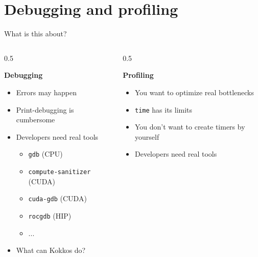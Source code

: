 \documentclass[
    aspectratio=169,
    \createHandout
]{beamer}
\begin{document}

\section{Debugging and profiling}

\begin{frame}{What is this about?}
    \begin{columns}[T]
        \begin{column}{0.5\linewidth}
            \begin{center}
                \textbf{Debugging}
            \end{center}
            \begin{itemize}
                \item Errors may happen
                \item Print-debugging is cumbersome
                \item Developers need real tools
                \begin{itemize}
                    \item \texttt{gdb} (CPU)
                    \item \texttt{compute-sanitizer} (CUDA)
                    \item \texttt{cuda-gdb} (CUDA)
                    \item \texttt{rocgdb} (HIP)
                    \item ...
                \end{itemize}
                \item What can Kokkos do?
            \end{itemize}
        \end{column}
        \pause
        \begin{column}{0.5\linewidth}
            \begin{center}
                \textbf{Profiling}
            \end{center}
            \begin{itemize}
                \item You want to optimize real bottlenecks
                \item \texttt{time} has its limits
                \item You don't want to create timers by yourself
                \item Developers need real tools
                \begin{itemize}

\end{itemize}
\end{itemize}
\end{column}
\end{columns}
\end{frame}
\end{document}
